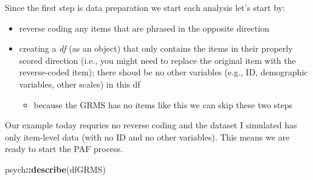 \documentclass[
  english,
]{book}
\newenvironment{Shaded}{\begin{snugshade}}{\end{snugshade}}
\newcommand{\KeywordTok}[1]{\textcolor[rgb]{0.13,0.29,0.53}{\textbf{#1}}}
\newcommand{\NormalTok}[1]{#1}
\newcommand{\OperatorTok}[1]{\textcolor[rgb]{0.81,0.36,0.00}{\textbf{#1}}}
\providecommand{\tightlist}{%
  \setlength{\itemsep}{0pt}\setlength{\parskip}{0pt}}
\begin{document}
Since the first step is data preparation we start each analysis let's start by:

\begin{itemize}
\tightlist
\item
  reverse coding any items that are phrased in the opposite direction
\item
  creating a \emph{df} (as an object) that only contains the items in their properly scored direction (i.e., you might need to replace the original item with the reverse-coded item); there shoud be no other variables (e.g., ID, demographic variables, other scales) in this df

  \begin{itemize}
  \tightlist
  \item
    because the GRMS has no items like this we can skip these two steps
  \end{itemize}
\end{itemize}

Our example today requries no reverse coding and the dataset I simulated has only item-level data (with no ID and no other variables). This means we are ready to start the PAF process.

\begin{Shaded}
\begin{Highlighting}[]
\NormalTok{psych}\OperatorTok{::}\KeywordTok{describe}\NormalTok{(dfGRMS) }
\end{Highlighting}
\end{Shaded}
\end{document}
